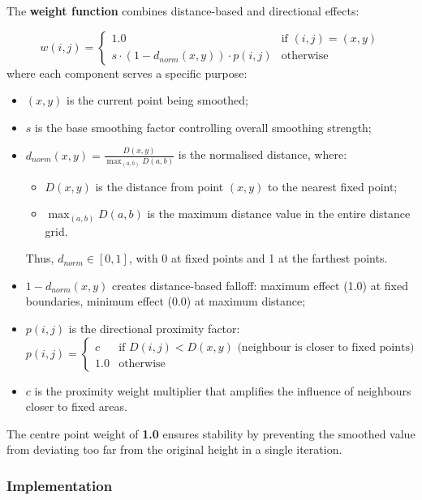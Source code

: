 \hfill


The \textbf{weight function} combines distance-based and directional effects:

\[w(i,j) = \begin{cases}
1.0 & \text{if } (i,j) = (x,y) \\
s \cdot (1 - d_{norm}(x,y)) \cdot p(i,j) & \text{otherwise}
\end{cases}
\]
where each component serves a specific purpose:
\begin{itemize}
    \item $(x,y)$ is the current point being smoothed;
    \item $s$ is the base smoothing factor controlling overall smoothing strength;
    \item \(d_{norm}(x,y) = \frac{D(x,y)}{\max_{(a,b)} D(a,b)}\)  is the normalised distance, where:
        \begin{itemize}
            \item $D(x,y)$ is the distance from point $(x,y)$ to the nearest fixed point;
            \item $\max_{(a,b)} D(a,b)$ is the maximum distance value in the entire distance grid.
        \end{itemize}
    Thus, $d_{norm} \in [0, 1]$, with 0 at fixed points and 1 at the farthest points.
    \item $1 - d_{norm}(x,y)$ creates distance-based falloff: 
        maximum effect (1.0) at fixed boundaries, minimum effect (0.0) at maximum distance;
    \item $p(i,j)$ is the directional proximity factor:
        \[p(i,j) = \begin{cases}
        c & \text{if } D(i,j) < D(x,y) \text{ (neighbour is closer to fixed points)} \\
        1.0 & \text{otherwise}
        \end{cases}\]
    
    \item $c$ is the proximity weight multiplier that amplifies the influence of neighbours closer to fixed areas.
\end{itemize}

The centre point weight of \textbf{1.0} ensures stability by preventing the smoothed value from deviating too far from the original height in a single iteration.

\subsubsection{Implementation}

